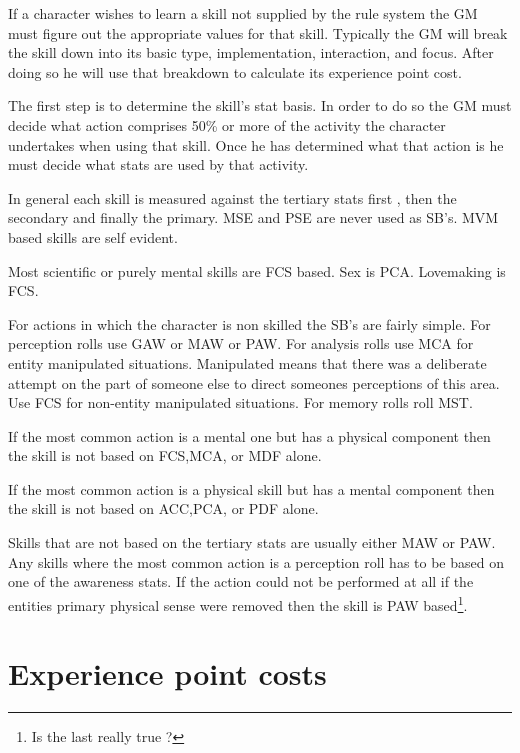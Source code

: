 \normalsize

If a character wishes to learn a skill not supplied by the rule 
system the GM must figure out the appropriate values for that skill. 
Typically the GM will break the skill down into its basic type, 
implementation, interaction, and focus. After doing so he will use 
that breakdown to calculate its experience point cost.

The first step is to determine the skill's stat basis. In order to do 
so the GM must decide what action comprises 50\% or more of the activity
the character undertakes when using that skill. Once he has determined 
what that action is he must decide what stats are used by that activity.

In general each skill is measured against the tertiary stats first , then the 
secondary and finally the primary. MSE and PSE are never used as SB's.
MVM based skills are self evident. 

Most scientific or purely mental skills are FCS based.
Sex is PCA. Lovemaking is FCS.

For actions in which the character is non skilled the SB's are fairly
simple. For perception rolls use GAW or MAW or PAW. For analysis rolls
use MCA for entity manipulated situations. Manipulated means that there
was a deliberate attempt on the part of someone else to direct someones
perceptions of this area. Use FCS for non-entity manipulated
situations. For memory rolls roll MST. 

If the most common action is a mental one but has a physical component then
the skill is not based on FCS,MCA, or MDF alone.

If the most common action is a physical skill but has a mental component then the
skill is not based on ACC,PCA, or PDF alone.

Skills that are not based on the tertiary stats are usually either MAW
or PAW. Any skills where the most common action is a perception roll has
to be based on one of the awareness stats. If the action could not be
performed at all if the entities primary physical sense were removed
then the skill is PAW based\footnote{Is the last really true ?}. 



\section{Experience point costs}



